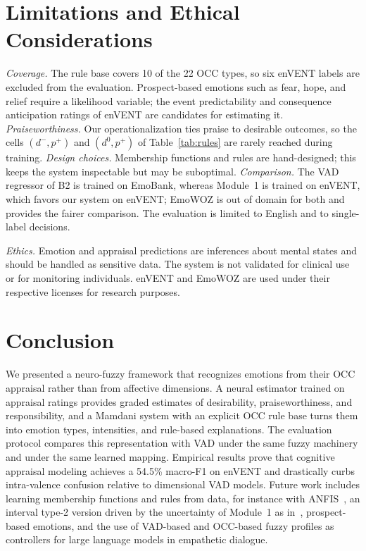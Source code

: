 \documentclass[conference, a4paper]{IEEEtran}
\begin{document}
\section{Limitations and Ethical Considerations}
\label{sec:limitations}
\textit{Coverage.} The rule base covers 10 of the 22 OCC types, so six enVENT labels are excluded from the evaluation. Prospect-based emotions such as fear, hope, and relief require a likelihood variable; the event predictability and consequence anticipation ratings of enVENT are candidates for estimating it. \textit{Praiseworthiness.} Our operationalization ties praise to desirable outcomes, so the cells $(d^{-}, p^{+})$ and $(d^{0}, p^{+})$ of Table~\ref{tab:rules} are rarely reached during training. \textit{Design choices.} Membership functions and rules are hand-designed; this keeps the system inspectable but may be suboptimal. \textit{Comparison.} The VAD regressor of B2 is trained on EmoBank, whereas Module~1 is trained on enVENT, which favors our system on enVENT; EmoWOZ is out of domain for both and provides the fairer comparison. The evaluation is limited to English and to single-label decisions.

\textit{Ethics.} Emotion and appraisal predictions are inferences about mental states and should be handled as sensitive data. The system is not validated for clinical use or for monitoring individuals. enVENT and EmoWOZ are used under their respective licenses for research purposes.

\section{Conclusion}
\label{sec:conclusion}
We presented a neuro-fuzzy framework that recognizes emotions from their OCC appraisal rather than from affective dimensions. A neural estimator trained on appraisal ratings provides graded estimates of desirability, praiseworthiness, and responsibility, and a Mamdani system with an explicit OCC rule base turns them into emotion types, intensities, and rule-based explanations. The evaluation protocol compares this representation with VAD under the same fuzzy machinery and under the same learned mapping. Empirical results prove that cognitive appraisal modeling achieves a 54.5\% macro-F1 on enVENT and drastically curbs intra-valence confusion relative to dimensional VAD models. Future work includes learning membership functions and rules from data, for instance with ANFIS~\cite{jang1993anfis}, an interval type-2 version driven by the uncertainty of Module~1 as in~\cite{bensaid_cat2nfi}, prospect-based emotions, and the use of VAD-based and OCC-based fuzzy profiles as controllers for large language models in empathetic dialogue.
\end{document}
